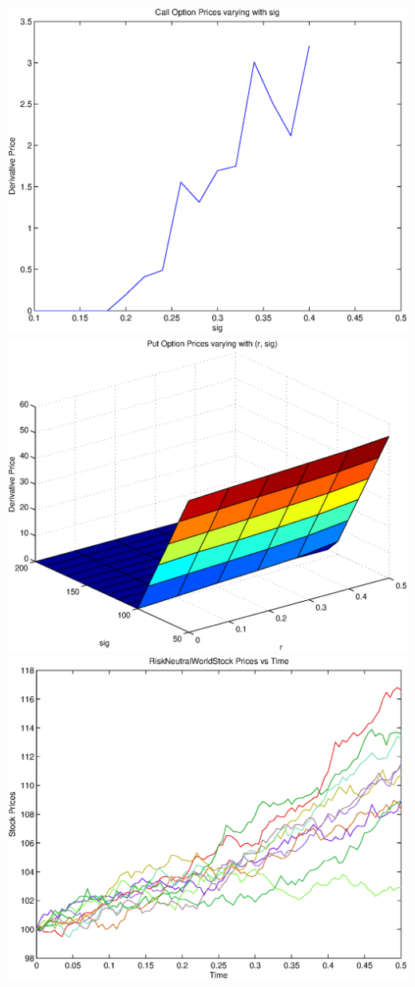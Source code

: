 \documentclass{article}
\begin{document}
\includegraphics[width=\textwidth]{Call_Option_Prices_varying_with_sig}
\includegraphics[width=\textwidth]{Put_Option_Prices_varying_with_(r,_sig)}
\includegraphics[width=\textwidth]{RiskNeutralWorld_Stock_Prices_vs_Time}
\end{document}
